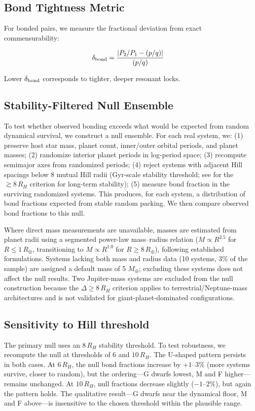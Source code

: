 \documentclass[twocolumn,usenatbib]{mnras}
\begin{document}
\subsection{Bond Tightness Metric}

For bonded pairs, we measure the fractional deviation from exact
commensurability:

\begin{equation}
\delta_{\rm bond} = \frac{|P_2/P_1 - (p/q)|}{(p/q)}
\label{eq:tightness}
\end{equation}

Lower $\delta_{\rm bond}$ corresponds to tighter, deeper resonant locks.

\subsection{Stability-Filtered Null Ensemble}

To test whether observed bonding exceeds what would be expected from random
dynamical survival, we construct a null ensemble. For each real system, we:
(1) preserve host star mass, planet count, inner/outer orbital periods, and
planet masses; (2) randomize interior planet periods in log-period space;
(3) recompute semimajor axes from randomized periods; (4) reject systems with
adjacent Hill spacings below 8 mutual Hill radii (Gyr-scale stability
threshold; see \citet{puwu2015} for the $\gtrsim 8\,R_H$ criterion for
long-term stability); (5) measure bond fraction in the surviving randomized
systems. This produces, for each system, a distribution of bond fractions
expected from stable random packing. We then compare observed bond fractions
to this null.

Where direct mass measurements are unavailable, masses are estimated from
planet radii using a segmented power-law mass--radius relation
($M \propto R^{2.5}$ for $R \leq 1\,R_\oplus$, transitioning to $M \propto
R^{1.0}$ for $R \geq 8\,R_\oplus$), following established
formulations\citep{weiss2018}. Systems lacking both mass and radius data
(10 systems, 3\% of the sample) are assigned a default mass of 5 $M_\oplus$;
excluding these systems does not affect the null results. Two Jupiter-mass
systems are excluded from the null construction because the $\Delta \geq
8\,R_H$ criterion applies to terrestrial/Neptune-mass architectures and is not
validated for giant-planet-dominated configurations.

\subsection{Sensitivity to Hill threshold}
\label{sec:hill_threshold}
The primary null uses an $8\,R_H$ stability threshold. To test robustness, we
recompute the null at thresholds of 6 and $10\,R_H$. The U-shaped pattern
persists in both cases. At $6\,R_H$, the null bond fractions increase by
$+1$--$3\%$ (more systems survive, closer to random), but the ordering---G
dwarfs lowest, M and F higher---remains unchanged. At $10\,R_H$, null fractions
decrease slightly ($-1$--$2\%$), but again the pattern holds. The qualitative
result---G dwarfs near the dynamical floor, M and F above---is insensitive to
the chosen threshold within the plausible range.
\end{document}
